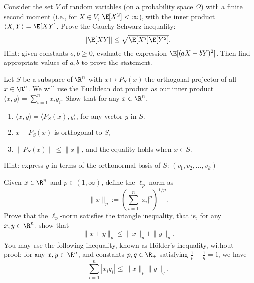 \documentclass[11pt,nocut]{article}
\begin{document}
\vspace{1mm}

\begin{problem}[1.5 points]
Consider the set $V$ of random variables (on a probability space $\Omega$) with a finite second moment (i.e., for $X\in V$, $\E[X^2]<\infty$), with the inner product $\langle X,Y \rangle = \E[XY]$. Prove the Cauchy-Schwarz inequality: 
$$
|\E[XY]| \le \sqrt{\E[X^2]\E[Y^2]}.   
$$
Hint: given constants $a,b \ge 0$, evaluate the expression $\E[(aX-bY)^2]$. Then find appropriate values of $a,b$ to prove the statement. 
\end{problem}
    

\begin{problem}[3 points]
    Let $S$ be a subspace of $\R^n$ with $x \mapsto P_S(x)$ the orthogonal projector of all $x \in \R^n$. We will use the Euclidean dot product as our inner product $\langle x, y\rangle = \sum_{i=1}^n x_i y_i$. Show that for any $x \in \R^n$, 
    \begin{enumerate}[label=\normalfont(\textbf{\alph*})]
        \item $\langle x, y\rangle = \langle P_S(x), y\rangle$, for any vector $y$ in $S$. 
        \item $x - P_S(x)$ is orthogonal to $S$,
        \item $\lVert P_S(x) \rVert \leq \lVert x \rVert$, and the equality holds when $x\in S$.
    \end{enumerate}  
Hint: express $y$ in terms of the orthonormal basis of $S$: $(v_1, v_2, ..., v_k)$. 
\end{problem}


\vspace{1mm}

\begin{problem}[$\star$] 
Given $x\in\R^n$ and $p\in (1,\infty)$, define the $\ell_p$-norm as 
$$\|x\|_p := \left(\sum_{i=1}^n |x_i|^p\right)^{1/p}.$$
Prove that the $\ell_p$-norm satisfies the triangle inequality, that is, for any $x,y\in\R^n$, show that
$$
\|x + y \|_p \le \|x\|_p + \|y\|_p. 
$$
You may use the following inequality, known as Hölder's inequality, without proof: 
for any $x,y\in\R^n$, and constants $p,q\in\R_+$ satisfying $\frac{1}{p} + \frac{1}{q}=1$, we have
$$
\sum_{i=1}^n |x_i y_i| \le \|x\|_p\|y\|_q. 
$$
\end{problem}
\end{document}
